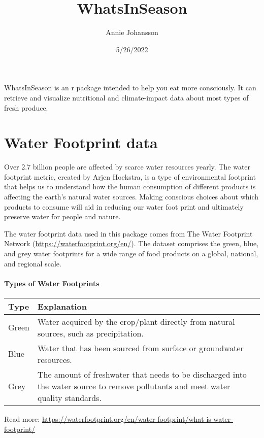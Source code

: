 \documentclass[
]{article}
\title{WhatsInSeason}
\author{Annie Johansson}
\date{5/26/2022}
\begin{document}
\maketitle

WhatsInSeason is an r package intended to help you eat more consciously.
It can retrieve and visualize nutritional and climate-impact data about
most types of fresh produce.

\hypertarget{water-footprint-data}{%
\section{Water Footprint data}\label{water-footprint-data}}

Over 2.7 billion people are affected by scarce water resources yearly.
The water footprint metric, created by Arjen Hoekstra, is a type of
environmental footprint that helps us to understand how the human
consumption of different products is affecting the earth's natural water
sources. Making conscious choices about which products to consume will
aid in reducing our water foot print and ultimately preserve water for
people and nature.

The water footprint data used in this package comes from The Water
Footprint Network (\url{https://waterfootprint.org/en/}). The dataset
comprises the green, blue, and grey water footprints for a wide range of
food products on a global, national, and regional scale.

\hypertarget{types-of-water-footprints}{%
\paragraph{Types of Water Footprints}\label{types-of-water-footprints}}

\captionsetup[table]{labelformat=empty,skip=1pt}
\begin{longtable}{ll}
\toprule
Type & Explanation \\ 
\midrule
Green & Water acquired by the crop/plant directly from natural sources, such as precipitation. \\ 
Blue & Water that has been sourced from surface or groundwater resources. \\ 
Grey & The amount of freshwater that needs to be discharged into the water source to remove pollutants and meet water quality standards. \\ 
\bottomrule
\end{longtable}

Read more:
\url{https://waterfootprint.org/en/water-footprint/what-is-water-footprint/}
\end{document}
